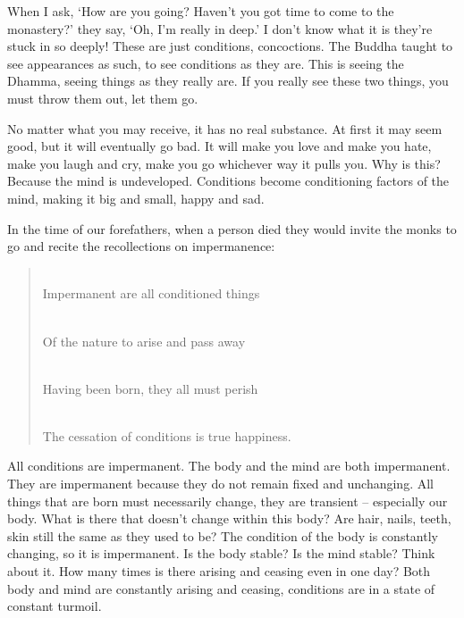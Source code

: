 When I ask, `How are you going? Haven't you got time to come to the monastery?' they say, `Oh, I'm really in deep.' I don't know what it is they're stuck in so deeply! These are just conditions, concoctions. The Buddha taught to see appearances as such, to see conditions as they are. This is seeing the Dhamma, seeing things as they really are. If you really see these two things, you must throw them out, let them go. 

No matter what you may receive, it has no real substance. At first it may seem good, but it will eventually go bad. It will make you love and make you hate, make you laugh and cry, make you go whichever way it pulls you. Why is this? Because the mind is undeveloped. Conditions become conditioning factors of the mind, making it big and small, happy and sad. 

In the time of our forefathers, when a person died they would invite the monks to go and recite the recollections on impermanence:

\begin{verse}
\\
Impermanent are all conditioned things

\\
Of the nature to arise and pass away

\\
Having been born, they all must perish

\\
The cessation of conditions is true happiness.
\end{verse}

All conditions are impermanent. The body and the mind are both impermanent. They are impermanent because they do not remain fixed and unchanging. All things that are born must necessarily change, they are transient -- especially our body. What is there that doesn't change within this body? Are hair, nails, teeth, skin still the same as they used to be? The condition of the body is constantly changing, so it is impermanent. Is the body stable? Is the mind stable? Think about it. How many times is there arising and ceasing even in one day? Both body and mind are constantly arising and ceasing, conditions are in a state of constant turmoil. 

